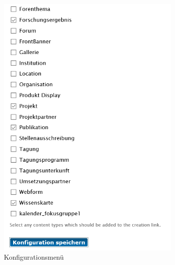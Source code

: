 \begin{figure}[H]
	\centering
	\begin{subfigure}[b]{0.4\textwidth}
		\centering
		\includegraphics[height=0.20\textheight]{images/config_nodecreationlinks}
		\caption[]{Konfigurationsmenü}
		\label{fig:config_nodecreationlinks}
	\end{subfigure}
	\begin{subfigure}[b]{0.4\textwidth}
		\centering

\end{subfigure}
\end{figure}
